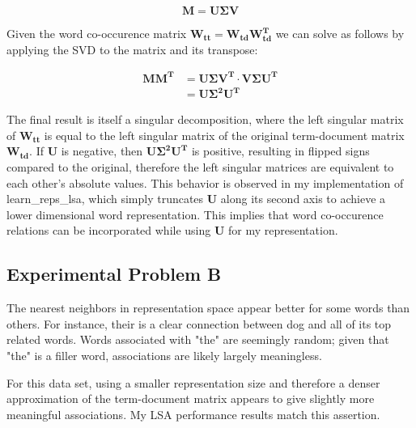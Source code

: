 \begin{equation*}
    \bm{M} = \bm{U \Sigma V}
\end{equation*}

Given the word co-occurence matrix $\bm{W_{tt}} = \bm{W_{td}W_{td}^T}$ we can solve as follows by applying the SVD to the matrix and its transpose:

\begin{align*}
    \bm{MM^T} & = \bm{U \Sigma V^T} \cdot \bm{V \Sigma U^T} \\
              & = \bm{U \Sigma^2 U^T}
\end{align*}

The final result is itself a singular decomposition, where the left singular matrix of $\bm{W_{tt}}$ is equal to the left singular matrix of the original term-document matrix $\bm{W_{td}}$.
If $\bm{U}$ is negative, then $\bm{U \Sigma^2 U^T}$ is positive, resulting in flipped signs compared to the original, therefore the left singular matrices are equivalent to each other's absolute values. This behavior is observed in my implementation of learn\_reps\_lsa, which simply truncates $\bm{U}$ along its second axis to achieve a lower dimensional word representation. This implies that word co-occurence relations can be incorporated while using $\bm{U}$ for my representation.

\subsection*{Experimental Problem B}

The nearest neighbors in representation space appear better for some words than others. For instance, their is a clear connection between dog and all of its top related words. Words associated with "the" are seemingly random; given that "the" is a filler word, associations are likely largely meaningless.

For this data set, using a smaller representation size and therefore a denser approximation of the term-document matrix appears to give slightly more meaningful associations. My LSA performance results match this assertion.

